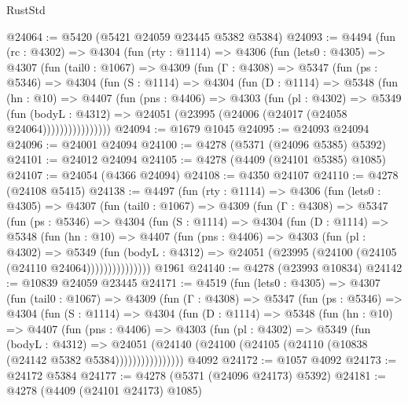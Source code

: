 \begin{lexlean}{RustStd}
\begin{coremodule}
{\begin{coremodule}
{{{{{{{{{{{{{{{{{{{{{{{{{{{{{{{{{{{@24064 := @5420 (@5421 @24059 @23445 @5382 @5384)
@24093 := @4494
    (fun (rc : @4302) =>
    @4304
      (fun (rty : @1114) =>
      @4306
        (fun (lets0 : @4305) =>
        @4307
          (fun (tail0 : @1067) =>
          @4309
            (fun (Γ : @4308) =>
            @5347
              (fun (ps : @5346) =>
              @4304
                (fun (S : @1114) =>
                @4304
                  (fun (D : @1114) =>
                  @5348
                    (fun (hn : @10) =>
                    @4407
                      (fun (pns : @4406) =>
                      @4303
                        (fun (pl : @4302) =>
                        @5349
                          (fun (bodyL : @4312) =>
                          @24051 (@23995 (@24006 (@24017 (@24058 @24064))))))))))))))))
@24094 := @1679 @1045
@24095 := @24093 @24094
@24096 := @24001 @24094
@24100 := @4278 (@5371 (@24096 @5385) @5392)
@24101 := @24012 @24094
@24105 := @4278 (@4409 (@24101 @5385) @1085)
@24107 := @24054 (@4366 @24094)
@24108 := @4350 @24107
@24110 := @4278 (@24108 @5415)
@24138 := @4497
    (fun (rty : @1114) =>
    @4306
      (fun (lets0 : @4305) =>
      @4307
        (fun (tail0 : @1067) =>
        @4309
          (fun (Γ : @4308) =>
          @5347
            (fun (ps : @5346) =>
            @4304
              (fun (S : @1114) =>
              @4304
                (fun (D : @1114) =>
                @5348
                  (fun (hn : @10) =>
                  @4407
                    (fun (pns : @4406) =>
                    @4303
                      (fun (pl : @4302) =>
                      @5349
                        (fun (bodyL : @4312) =>
                        @24051 (@23995 (@24100 (@24105 (@24110 @24064)))))))))))))))
    @1961
@24140 := @4278 (@23993 @10834)
@24142 := @10839 @24059 @23445
@24171 := @4519
    (fun (lets0 : @4305) =>
    @4307
      (fun (tail0 : @1067) =>
      @4309
        (fun (Γ : @4308) =>
        @5347
          (fun (ps : @5346) =>
          @4304
            (fun (S : @1114) =>
            @4304
              (fun (D : @1114) =>
              @5348
                (fun (hn : @10) =>
                @4407
                  (fun (pns : @4406) =>
                  @4303
                    (fun (pl : @4302) =>
                    @5349
                      (fun (bodyL : @4312) =>
                      @24051
                        (@24140 (@24100 (@24105 (@24110 (@10838 (@24142 @5382 @5384))))))))))))))))
    @4092
@24172 := @1057 @4092
@24173 := @24172 @5384
@24177 := @4278 (@5371 (@24096 @24173) @5392)
@24181 := @4278 (@4409 (@24101 @24173) @1085)
}}}}}}}}}}}}}}}}}}}}}}}}}}}}}}}}}}}
\end{coremodule}}
\end{coremodule}
\end{lexlean}
